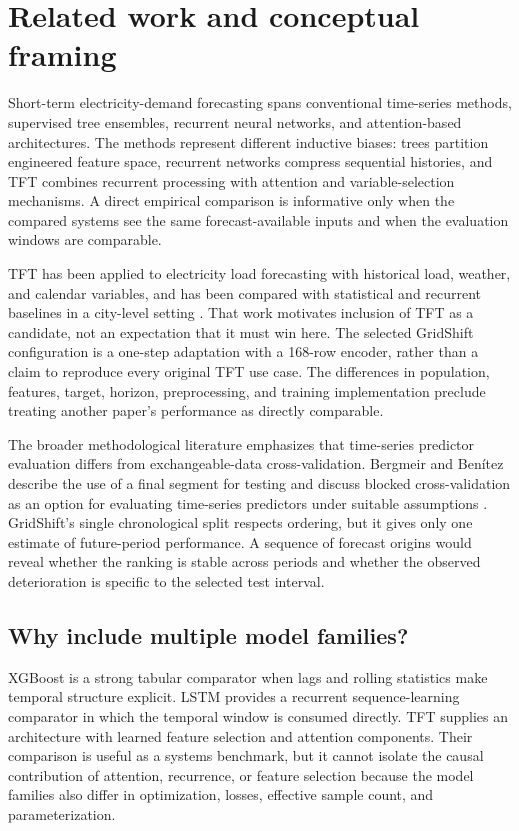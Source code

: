 \documentclass[12pt,a4paper]{article}
\begin{document}
\newpage
\section{Related work and conceptual framing}
Short-term electricity-demand forecasting spans conventional time-series methods, supervised tree ensembles, recurrent neural networks, and attention-based architectures. The methods represent different inductive biases: trees partition engineered feature space, recurrent networks compress sequential histories, and TFT combines recurrent processing with attention and variable-selection mechanisms. A direct empirical comparison is informative only when the compared systems see the same forecast-available inputs and when the evaluation windows are comparable.

TFT has been applied to electricity load forecasting with historical load, weather, and calendar variables, and has been compared with statistical and recurrent baselines in a city-level setting \cite{pham2022}. That work motivates inclusion of TFT as a candidate, not an expectation that it must win here. The selected GridShift configuration is a one-step adaptation with a 168-row encoder, rather than a claim to reproduce every original TFT use case. The differences in population, features, target, horizon, preprocessing, and training implementation preclude treating another paper's performance as directly comparable.

The broader methodological literature emphasizes that time-series predictor evaluation differs from exchangeable-data cross-validation. Bergmeir and Benítez describe the use of a final segment for testing and discuss blocked cross-validation as an option for evaluating time-series predictors under suitable assumptions \cite{bergmeir2012}. GridShift's single chronological split respects ordering, but it gives only one estimate of future-period performance. A sequence of forecast origins would reveal whether the ranking is stable across periods and whether the observed deterioration is specific to the selected test interval.

\subsection{Why include multiple model families?}
XGBoost is a strong tabular comparator when lags and rolling statistics make temporal structure explicit. LSTM provides a recurrent sequence-learning comparator in which the temporal window is consumed directly. TFT supplies an architecture with learned feature selection and attention components. Their comparison is useful as a systems benchmark, but it cannot isolate the causal contribution of attention, recurrence, or feature selection because the model families also differ in optimization, losses, effective sample count, and parameterization.
\end{document}
